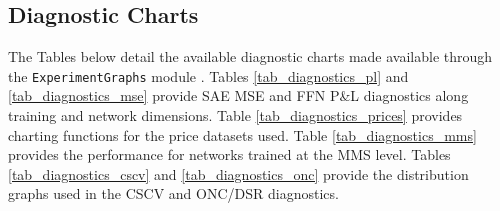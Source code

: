 \documentclass[a4paper,11pt,oneside]{article}
\theoremstyle{plain}
\theoremstyle{definition}
\begin{document}
	\newpage
	\subsection{Diagnostic Charts}\label{appendix_diagnostics}
	
	The Tables below detail the available diagnostic charts made available through the \texttt{ExperimentGraphs} module \citep{DCExperimentGraph}. Tables \ref{tab_diagnostics_pl} and \ref{tab_diagnostics_mse} provide SAE MSE and FFN P\&L diagnostics along training and network dimensions. Table \ref{tab_diagnostics_prices} provides charting functions for the price datasets used. Table \ref{tab_diagnostics_mms} provides the performance for networks trained at the MMS level. Tables \ref{tab_diagnostics_cscv} and \ref{tab_diagnostics_onc} provide the distribution graphs used in the CSCV and ONC/DSR diagnostics.
	
\end{document}
